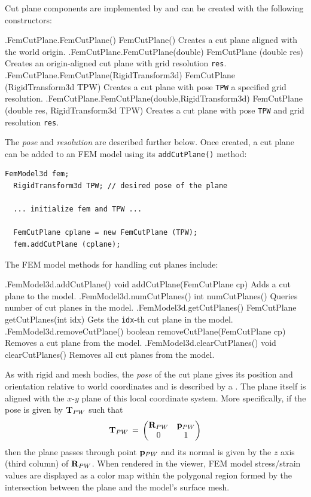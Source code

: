 Cut plane components are implemented by
 and can be created
with the following constructors:
%
\begin{methodtable}{0.46}{0.54}
\midline
%
\methodentry
{\fem.FemCutPlane.FemCutPlane()}
{FemCutPlane()}%
{Creates a cut plane aligned with the world origin.}%
%
\methodentry
{\fem.FemCutPlane.FemCutPlane(double)}
{FemCutPlane (double res)}%
{Creates an origin-aligned cut plane with grid resolution {\tt res}.}%
%
\methodentry
{\fem.FemCutPlane.FemCutPlane(RigidTransform3d)}
{FemCutPlane (RigidTransform3d TPW)}%
{Creates a cut plane with pose {\tt TPW} a specified grid resolution.}%
%
\methodentry
{\fem.FemCutPlane.FemCutPlane(double,RigidTransform3d)}
{FemCutPlane (double res, RigidTransform3d TPW)}%
{Creates a cut plane with pose {\tt TPW} and grid resolution {\tt res}.}%
%
\midline
\end{methodtable}
%
The {\it pose} and {\it resolution} are described further below.  Once
created, a cut plane can be added to an FEM model using its
{\tt addCutPlane()} method:
%
\begin{lstlisting}[]
  FemModel3d fem;
  RigidTransform3d TPW; // desired pose of the plane

  ... initialize fem and TPW ...

  FemCutPlane cplane = new FemCutPlane (TPW);
  fem.addCutPlane (cplane);
\end{lstlisting}
%
The FEM model methods for handling cut planes include:
%
\begin{methodtable}{0.46}{0.54}
\midline
%
\methodentry
{\fem.FemModel3d.addCutPlane()}
{void addCutPlane(FemCutPlane cp)}%
{Adds a cut plane to the model.}%
%
\methodentry
{\fem.FemModel3d.numCutPlanes()}
{int numCutPlanes()}%
{Queries number of cut planes in the model.}%
%
\methodentry
{\fem.FemModel3d.getCutPlanes()}
{FemCutPlane getCutPlanes(int idx)}%
{Gets the {\tt idx}-th cut plane in the model.}%
%
\methodentry
{\fem.FemModel3d.removeCutPlane()}
{boolean removeCutPlane(FemCutPlane cp)}%
{Removes a cut plane from the model.}%
%
\methodentry
{\fem.FemModel3d.clearCutPlanes()}
{void clearCutPlanes()}%
{Removes all cut planes from the model.}%
\midline
\end{methodtable}
%
As with rigid and mesh bodies, the {\it pose} of the cut plane gives
its position and orientation relative to world coordinates and is
described by a .  The
plane itself is aligned with the $x$-$y$ plane of this local coordinate
system. More specifically, if the pose is given by ${\bf T}_{PW}$ such that
%
\begin{equation}
{\bf T}_{PW} \, = \,
\left(\begin{matrix} {\bf R}_{PW} & {\bf p}_{PW} \\ 0 & 1 \end{matrix}\right)
\end{equation}
%
then the plane passes through point ${\bf p}_{PW}$ and its normal is given
by the $z$ axis (third column) of ${\bf R}_{PW}$.  When rendered in the
viewer, FEM model stress/strain values are displayed as a color map
within the polygonal region formed by the intersection between the
plane and the model's surface mesh. 

